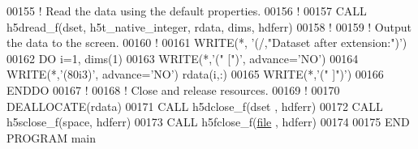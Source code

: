 \begin{DoxyCode}
00155   \textcolor{comment}{! Read the data using the default properties.}
00156   \textcolor{comment}{!}
00157   \textcolor{keyword}{CALL }h5dread\_f(dset, h5t\_native\_integer, rdata, dims, hdferr)
00158   \textcolor{comment}{!}
00159   \textcolor{comment}{! Output the data to the screen.}
00160   \textcolor{comment}{!}
00161   \textcolor{keyword}{WRITE}(*, \textcolor{stringliteral}{'(/,"Dataset after extension:")'})
00162   \textcolor{keywordflow}{DO} i=1, dims(1)
00163      \textcolor{keyword}{WRITE}(*,\textcolor{stringliteral}{'(" [")'}, advance=\textcolor{stringliteral}{'NO'})
00164      \textcolor{keyword}{WRITE}(*,\textcolor{stringliteral}{'(80i3)'}, advance=\textcolor{stringliteral}{'NO'}) rdata(i,:)
00165      \textcolor{keyword}{WRITE}(*,\textcolor{stringliteral}{'(" ]")'})
00166 \textcolor{keywordflow}{  ENDDO}
00167   \textcolor{comment}{!}
00168   \textcolor{comment}{! Close and release resources.}
00169   \textcolor{comment}{!}
00170   \textcolor{keyword}{DEALLOCATE}(rdata)
00171   \textcolor{keyword}{CALL }h5dclose\_f(dset , hdferr)
00172   \textcolor{keyword}{CALL }h5sclose\_f(space, hdferr)
00173   \textcolor{keyword}{CALL }h5fclose\_f(\hyperlink{structfile}{file} , hdferr)
00174 
00175 \textcolor{keyword}{END PROGRAM }main
\end{DoxyCode}
